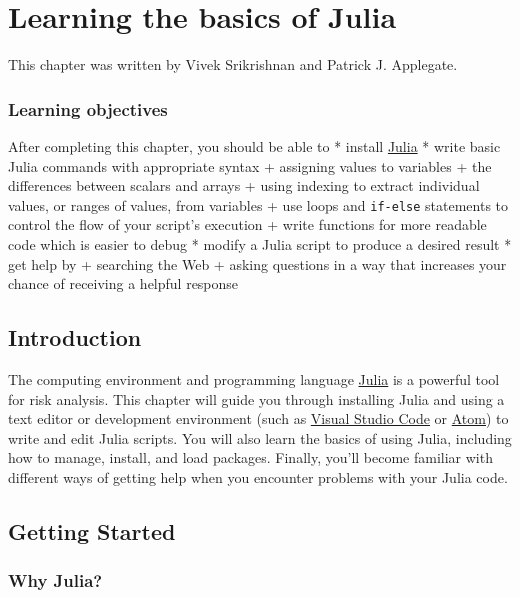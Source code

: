 \documentclass[
  11pt,
]{book}
\begin{document}
\hypertarget{julia-syntax}{%
\chapter{Learning the basics of Julia}\label{julia-syntax}}

This chapter was written by Vivek Srikrishnan and Patrick J. Applegate.

\hypertarget{learning-objectives}{%
\subsection*{Learning objectives}\label{learning-objectives}}


After completing this chapter, you should be able to * install \href{https://julialang.org}{Julia} * write basic Julia commands with appropriate syntax + assigning values to variables + the differences between scalars and arrays + using indexing to extract individual values, or ranges of values, from variables + use loops and \texttt{if-else} statements to control the flow of your script's execution + write functions for more readable code which is easier to debug * modify a Julia script to produce a desired result * get help by + searching the Web + asking questions in a way that increases your chance of receiving a helpful response

\hypertarget{introduction-1}{%
\section{Introduction}\label{introduction-1}}

The computing environment and programming language \href{http://julialang.org}{Julia} is a powerful tool for risk analysis. This chapter will guide you through installing Julia and using a text editor or development environment (such as \href{https://code.visualstudio.com/}{Visual Studio Code} or \href{https://atom.io/}{Atom}) to write and edit Julia scripts. You will also learn the basics of using Julia, including how to manage, install, and load packages. Finally, you'll become familiar with different ways of getting help when you encounter problems with your Julia code.

\hypertarget{getting-started}{%
\section{Getting Started}\label{getting-started}}

\hypertarget{why-julia}{%
\subsection{Why Julia?}\label{why-julia}}
\end{document}

